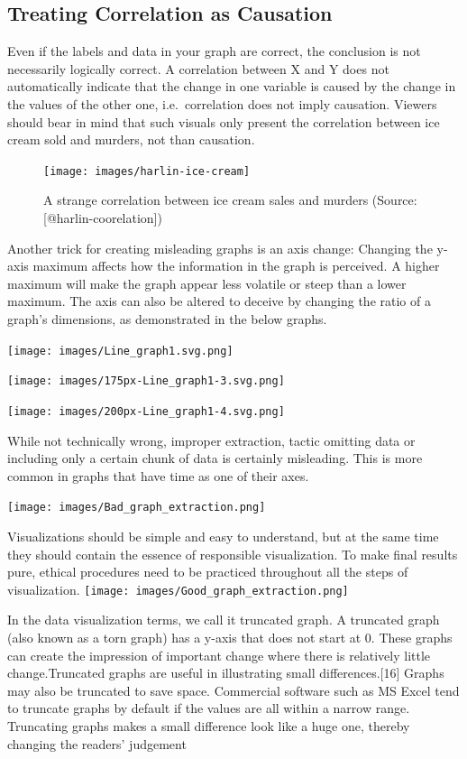 \documentclass[]{book}
\begin{document}
\hypertarget{treating-correlation-as-causation}{%
\subsection{Treating Correlation as Causation}\label{treating-correlation-as-causation}}

Even if the labels and data in your graph are correct, the conclusion is not necessarily logically correct. A correlation between X and Y does not automatically indicate that the change in one variable is caused by the change in the values of the other one, i.e.~correlation does not imply causation. Viewers should bear in mind that such visuals only present the correlation between ice cream sold and murders, not than causation.

\begin{figure}
\texttt{[image: images/harlin-ice-cream]} \caption{A strange correlation between ice cream sales and murders (Source: [@harlin-coorelation])}\label{fig:harlin-ice-cream}
\end{figure}

Another trick for creating misleading graphs is an axis change: Changing the y-axis maximum affects how the information in the graph is perceived. A higher maximum will make the graph appear less volatile or steep than a lower maximum. The axis can also be altered to deceive by changing the ratio of a graph's dimensions, as demonstrated in the below graphs.

\texttt{[image: images/Line\_graph1.svg.png]}

\texttt{[image: images/175px-Line\_graph1-3.svg.png]}

\texttt{[image: images/200px-Line\_graph1-4.svg.png]}

While not technically wrong, improper extraction, tactic omitting data or including only a certain chunk of data is certainly misleading. This is more common in graphs that have time as one of their axes.

\texttt{[image: images/Bad\_graph\_extraction.png]}

Visualizations should be simple and easy to understand, but at the same time they should contain the essence of responsible visualization. To make final results pure, ethical procedures need to be practiced throughout all the steps of visualization.
\texttt{[image: images/Good\_graph\_extraction.png]}

In the data visualization terms, we call it truncated graph. A truncated graph (also known as a torn graph) has a y-axis that does not start at 0. These graphs can create the impression of important change where there is relatively little change.Truncated graphs are useful in illustrating small differences.{[}16{]} Graphs may also be truncated to save space. Commercial software such as MS Excel tend to truncate graphs by default if the values are all within a narrow range. Truncating graphs makes a small difference look like a huge one, thereby changing the readers' judgement
\end{document}
